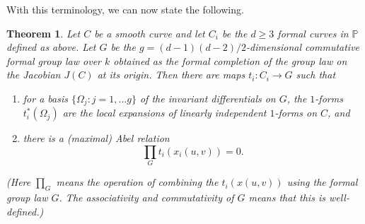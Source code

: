 \documentclass[12pt]{amsart}
\theoremstyle{theorem}
\newtheorem{thm}{Theorem}
\newcommand{\PP}{\mathbb{P}}
\begin{document}
With this terminology, we can now state the following.

\begin{thm}  
\label{FormalAbCharp}
Let $C$ be a smooth curve and let $C_i$ be the $d \ge 3$ formal curves in $\PP$ defined as above. Let $G$ be the
$g = (d-1)(d-2)/2$-dimensional commutative formal group law over $k$ obtained as the
formal completion of the group law on the Jacobian $J(C)$ at its origin.
Then there are maps $t_i : C_i \to G$ such that 
\begin{enumerate}
\item[(a)]  for a basis $\{\Omega_j : j = 1, \ldots g\}$ of the invariant differentials on $G$, the $1$-forms $t_i^*(\Omega_j)$ are
the local expansions of linearly independent $1$-forms on $C$, and
\item[(b)] there is a (maximal) \emph{Abel relation}
\begin{equation*}
\prod_G t_i(x_i(u,v)) = 0.
\end{equation*}
\end{enumerate}
(Here $\prod_G$ means the operation of combining the $t_i(x(u,v))$ using the 
formal group law $G$.  The associativity and commutativity of $G$ means that 
this is well-defined.)
\end{thm}
\end{document}
